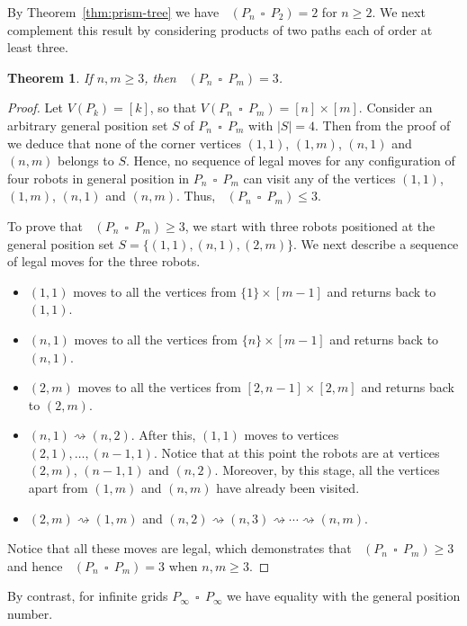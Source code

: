 \documentclass[a4paper,12pt]{article}
\DeclareMathOperator{\mob}{Mob_{gp}}
\DeclareMathOperator{\cp}{\,\square\,}
\newtheorem{theorem}{Theorem}[section]
\theoremstyle{definition}
\newcommand{\move}{\rightsquigarrow}
\begin{document}
	
	
	
	By Theorem~\ref{thm:prism-tree} we have $\mob(P_n\cp P_2) = 2$ for $n\ge 2$. We next complement this result by considering products of two paths each of order at least three. 
	
	\begin{theorem}
		\label{thm:grids}
		If $n, m\ge 3$, then $\mob(P_n\cp P_m) = 3$.
	\end{theorem}
	
	\begin{proof}
		Let $V(P_k) = [k]$, so that $V(P_n\cp P_m) = [n]\times [m]$. Consider an arbitrary general position set $S$ of $P_n\cp P_m$ with $|S| = 4$. Then from the proof of~\cite[Theorem 2.1]{klavzar-2021} we deduce that none of the corner vertices $(1,1)$, $(1,m)$, $(n,1)$ and $(n,m)$ belongs to $S$. Hence, no sequence of legal moves for any configuration of four robots in general position in $P_n\cp P_m$ can visit any of the vertices $(1,1)$, $(1,m)$, $(n,1)$ and $(n,m)$. Thus, $\mob(P_n\cp P_m) \le 3$.
		
		To prove that $\mob(P_n\cp P_m) \ge 3$, we start with three robots positioned at the general position set $S = \{(1,1), (n,1), (2,m)\}$. We next describe a sequence of legal moves for the three robots. 
		\begin{itemize}
			\item $(1,1)$ moves to all the vertices from $\{ 1\} \times [m-1]$ and returns back to $(1,1)$.  
			\item $(n,1)$ moves to all the vertices from $\{n\} \times [m-1]$ and returns back to $(n,1)$.  
			\item $(2,m)$ moves to all the vertices from $[2, n-1] \times [2, m]$ and returns back to $(2,m)$.  
			\item $(n,1) \move (n,2)$. After this, $(1,1)$ moves to vertices $(2,1), \dots, (n-1,1)$. Notice that at this point the robots are at vertices $(2,m)$, $(n-1,1)$ and $(n,2)$. Moreover, by this stage, all the vertices apart from $(1,m)$ and $(n,m)$ have already been visited.   
			\item $(2,m) \move (1,m)$ and $(n,2) \move(n,3) \move \cdots \move (n,m)$.
		\end{itemize}
		Notice that all these moves are legal, which demonstrates that $\mob(P_n\cp P_m) \ge 3$ and hence 
		$\mob(P_n\cp P_m) = 3$ when $n, m\ge 3$.
	\end{proof}
	
	By contrast, for infinite grids $P_{\infty } \cp P_{\infty }$ we have equality with the general position number.
	
\end{document}
